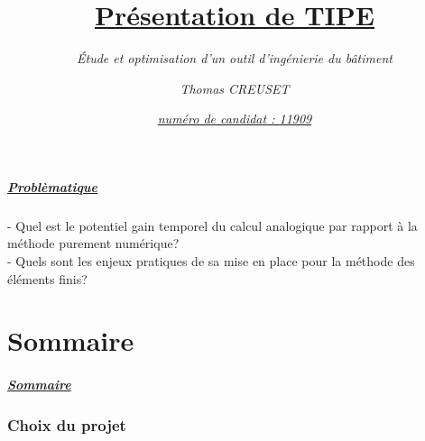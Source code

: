 \documentclass[10pt]{beamer}
\author{\textit{Thomas CREUSET}}
\title{\uline{Pr\'esentation de TIPE}}
\subtitle{\textit{\'Etude et optimisation d’un outil d'ing\'enierie du b\^atiment}}
\date{\underline{\textit{num\'ero de candidat : 11909}}}
\begin{document}
	\frame{\titlepage}

	\begin{frame}
		\frametitle{\uline{Probl\`ematique}}
		\begin{block}{}
			- Quel est le potentiel gain temporel du calcul analogique par rapport à la méthode purement
numérique?\\
			- Quels sont les enjeux pratiques de sa mise en place pour la méthode des éléments
finis?
		\end{block}
	\end{frame}

	\part{Sommaire}
	\begin{frame}
		\frametitle{\uline{Sommaire}}
		\tableofcontents
	\end{frame}

	\section{Choix du projet}
\end{document}
